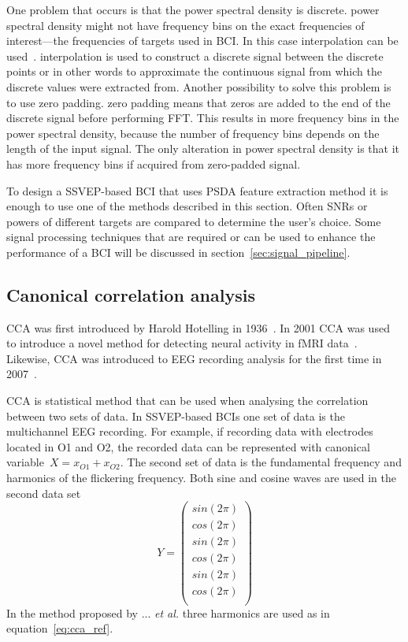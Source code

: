 One problem that occurs is that the \gls{power spectral density} is discrete. \Gls{power spectral density} might not have frequency bins on the exact frequencies of interest---the frequencies of \glspl{target} used in \gls{BCI}. In this case \gls{interpolation} can be used~\cite{cca_psda}. \Gls{interpolation} is used to construct a discrete signal between the discrete points or in other words to approximate the continuous signal from which the discrete values were extracted from. Another possibility to solve this problem is to use \gls{zero padding}. \Gls{zero padding} means that zeros are added to the end of the discrete signal before performing \gls{FFT}. This results in more \glspl{frequency bin} in the \gls{power spectral density}, because the number of \glspl{frequency bin} depends on the length of the input signal. The only alteration in \gls{power spectral density} is that it has more \glspl{frequency bin} if acquired from zero-padded signal.

To design a \gls{SSVEP}-based \gls{BCI} that uses \gls{PSDA} \gls{feature extraction} method it is enough to use one of the methods described in this section. Often \glspl{SNR} or powers of different \glspl{target} are compared to determine the user's choice. Some signal processing techniques that are required or can be used to enhance the performance of a \gls{BCI} will be discussed in section~\ref{sec:signal_pipeline}.

\subsection{Canonical correlation analysis}

\Gls{CCA} was first introduced by Harold Hotelling in 1936~\cite{cca_hotelling}. In 2001 \gls{CCA} was used to introduce a novel method for detecting neural activity in \gls{fMRI} data~\cite{cca_fmri}. Likewise, \gls{CCA} was introduced to \gls{EEG} recording analysis for the first time in 2007~\cite{cca_lin}. 

\Gls{CCA} is statistical method that can be used when analysing the correlation between two sets of data. In \gls{SSVEP}-based \glspl{BCI} one set of data is the multichannel \gls{EEG} recording. For example, if recording data with electrodes located in O1 and O2, the recorded data can be represented with canonical variable~$X=x_{O1}+x_{O2}$. The second set of data is the \gls{fundamental} frequency and \glspl{harmonic} of the \gls{flickering} frequency. Both sine and cosine waves are used in the second data set %
\begin{equation}
	\label{eq:cca_ref}
	Y=\left(\begin{matrix}
		sin(2\pi)\\
		cos(2\pi)\\
		sin(2\pi)\\
		cos(2\pi)\\
		sin(2\pi)\\
		cos(2\pi)\\
	\end{matrix}\right)
\end{equation}
In the method proposed by ... \textit{et al.} three harmonics are used as in equation~\ref{eq:cca_ref}.

